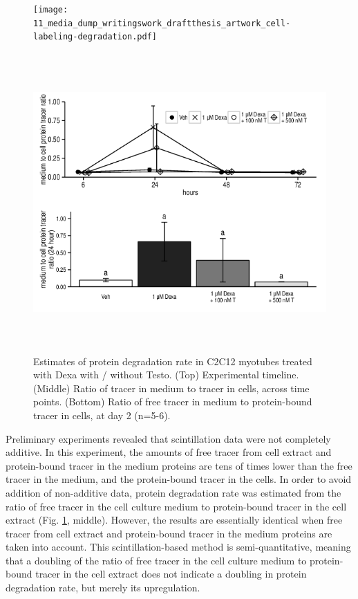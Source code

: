 \documentclass[12pt,english]{report}\usepackage[]{graphicx}\usepackage[]{color}
\newenvironment{knitrout}{}{} %
\begin{document}
\begin{figure}
\begin{minipage}[t][3.3in]{6in}%
\texttt{[image: 11\_media\_dump\_writingswork\_draftthesis\_artwork\_cell-labeling-degradation.pdf]}%
\end{minipage}

\begin{minipage}[t][4.5in][c]{6in}%
\begin{knitrout}
\color{fgcolor}
\includegraphics[width=6in,height=4.5in]{figure/proteindegradation-1} 

\end{knitrout}
%
\end{minipage} 

\protect\caption[Estimates of protein degradation rate in C2C12 myotubes treated with
Dexa with / without Testo.]{Estimates of protein degradation rate in C2C12 myotubes treated with
Dexa with / without Testo. (Top) Experimental timeline. (Middle) Ratio
of tracer in medium to tracer in cells, across time points. (Bottom)
Ratio of free tracer in medium to protein-bound tracer in cells, at
day 2 (n=5-6).\label{fig:protein-degradation-cells}}
\end{figure}


Preliminary experiments revealed that scintillation data were not
completely additive. In this experiment, the amounts of free tracer
from cell extract and protein-bound tracer in the medium proteins
are tens of times lower than the free tracer in the medium, and the
protein-bound tracer in the cells. In order to avoid addition of non-additive
data, protein degradation rate was estimated from the ratio of free
tracer in the cell culture medium to protein-bound tracer in the cell
extract (Fig. \ref{fig:protein-degradation-cells}, middle). However,
the results are essentially identical when free tracer from cell extract
and protein-bound tracer in the medium proteins are taken into account.
This scintillation-based method is semi-quantitative, meaning that
a doubling of the ratio of free tracer in the cell culture medium
to protein-bound tracer in the cell extract does not indicate a doubling
in protein degradation rate, but merely its upregulation.
\end{document}
